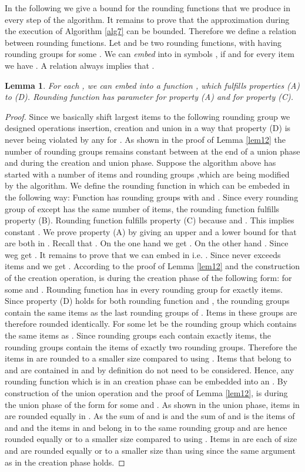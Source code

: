 \documentclass[a4paper,11pt]{article}
\newtheorem{lem}[thm]{Lemma}
\begin{document}
In the following we give a bound for the rounding functions  that we produce in every step of
the algorithm. 
It remains to prove that the approximation during the execution of Algorithm \ref{alg7} can be bounded.
Therefore we define a relation between rounding functions.
Let  and  be two rounding functions, with  having  rounding groups for 
some .
We can \emph{embed}  into  in symbols , if  and for 
every item  we 
have . A relation  always implies that 
.
\begin{lem}\label{lem14}
  For each , we can embed  into a function
  , which fulfills properties (A) to (D). Rounding function  has parameter
   for property (A) and  for property (C).
\end{lem}
\begin{proof}
	Since we basically shift largest items to the following rounding group we designed operations 
	insertion, creation and union in a way that property (D) is never being
	violated by any  for . As shown in the proof of Lemma \ref{lem12} the number of rounding groups remains
	constant between  at the end of a union phase and  during the creation and union phase.
	Suppose the algorithm above has started with a number of items  and rounding groups 
	,which are being modified	by the algorithm.
	We define the rounding function  in which  can be embeded in the following way: 
	Function  has rounding groups  with 
	 and .
	Since every rounding group of  except  has the same number of items, the rounding function
	 fulfills property (B). Rounding function  fulfills property (C) because  and . This implies constant .
	We prove property (A) by giving an upper and a lower bound for  that are both
	in . Recall that .
	On the one hand we get .
	On the other hand . Since 
	weg get .
	It remains to prove that we can embed  in  i.e. . 
	Since  never exceeds  items and  we get .
	According to the proof of Lemma \ref{lem12} and the construction of the creation operation,  is during 
	the creation phase
	of the following form:  for some  and . Rounding function 
	has in every rounding group  for  exactly  items.
	Since property (D) 
	holds for both rounding function  and , the rounding groups  contain
	the same items as the last  rounding groups of .
	Items in these groups are therefore rounded identically.
	For some  let  be the rounding group which contains the same items as .
	Since rounding groups  each contain exactly  items, the rounding groups 
	 contain the items of exactly two rounding groups. Therefore the items
	in  are rounded to a smaller size compared to using
	. Items that belong to  and 
	are contained in  and by definition do not need to be considered. Hence, any rounding function 
	which is in an creation phase can be embedded into an .
	By construction of the union operation and the proof of Lemma \ref{lem12},  is during the union phase
	of the form  for some  and 
	. As shown in the union phase, items in  are rounded equally
	in . As the sum of  and  is  and the sum of  and 
	is  the items of  and  and the items in  and  
	belong in  to the same rounding group and are hence rounded equally or to a smaller size compared to using
	.
	Items in  are each of size  and are rounded equally or to a smaller size 
	than using  since the same argument as in the creation phase holds.
\end{proof}
\end{document}
